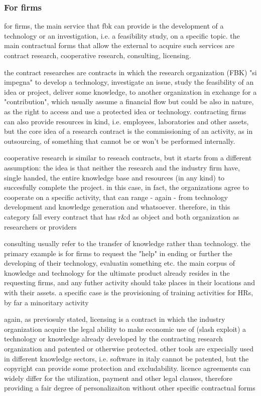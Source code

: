 \subsubsection{For firms}

for firms, the main service that fbk can provide is the development of a technology or an investigation, i.e. a feasibility study, on a specific topic. the main contractual forms that allow the external to acquire such services are contract research, cooperative research, consulting, licensing. 

the contract researches are contracts in which the research organization (FBK) "si impegna" to develop a technology, investigate an issue, study the feasibility of an idea or project, deliver some knowledge, to another organization in exchange for a "contribution", which usually assume a financial flow but could be also in nature, as the right to access and use a protected idea or technology. contracting firms can also provide resources in kind, i.e. employees, laboratories and other assets, but the core idea of a research contract is the commissioning of an activity, as in outsourcing, of something that cannot be or won't be performed internally.

cooperative research is similar to reseach contracts, but it starts from a different assumption: the idea is that neither the research and the industry firm have, single handed, the entire knowledge base and resources (in any kind) to succesfully complete the project. in this case, in fact, the organizations agree to cooperate on a specific activity, that can range - again - from technology development and knowledge generation and whatsoever. therefore, in this category fall every contract that has r\&d as object and both organization as researchers or providers

consulting usually refer to the transfer of knowledge rather than technology. the primary example is for firms to request the "help" in ending or further the developing of their technology, evaluatin something etc. the main corpus of knowledge and technology for the ultimate product already resides in the requesting firms, and any futher activity should take places in their locations and with their assets. a specific case is the provisioning of training activities for HRs, by far a minoritary activity

again, as previosuly stated, licensing is a contract in which the industry organization acquire the legal ability to make economic use of (slash exploit) a technology or knowledge already developed by the contracting research organization and patented or otherwise protected. other tools are expecially used in different knowledge sectors, i.e. software in italy cannot be patented, but the copyright can provide some protection and excludability. licence agreements can widely differ for the utilization, payment and other legal clauses, therefore providing a fair degree of personalizaiton without other specific contractual forms

